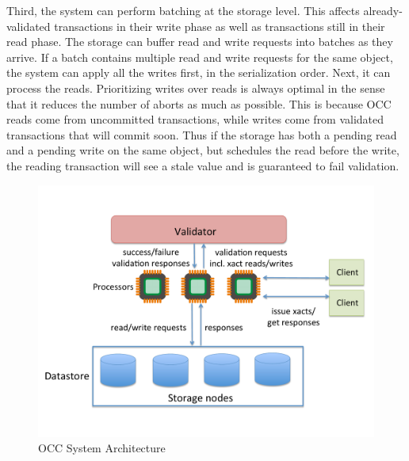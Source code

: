 Third, the system can perform batching at the storage level. This affects already-validated transactions in their write phase as well as transactions still in their read phase. The storage can buffer read and write requests into batches as they arrive. If a batch contains multiple read and write requests for the same object, the system can apply all the writes first, in the serialization order. Next, it can process the reads. Prioritizing writes over reads is always optimal in the sense that it reduces the number of aborts as much as possible. This is because OCC reads come from uncommitted transactions, while writes come from validated transactions that will commit soon. Thus if the storage has both a pending read and a pending write on the same object, but schedules the read before the write, the reading transaction will see a stale value and is guaranteed to fail validation. 


\begin{figure}[t]
 \centering
 \includegraphics[width=0.9\columnwidth]{figures/OCCArchitecture.pdf}
 \vspace{-.5em}
 \caption{OCC System Architecture}
 \label{fig:occ_arch}
\end{figure}


